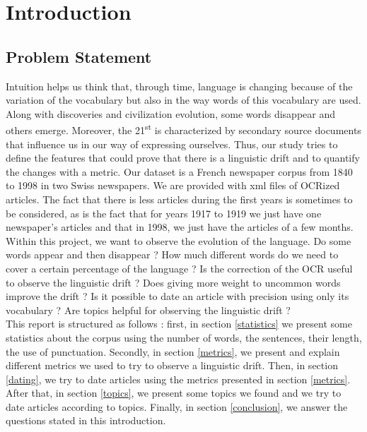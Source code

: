\section{Introduction}

\subsection{Problem Statement}
Intuition helps us think that, through time, language is changing because of the variation of the vocabulary but also in the way words of this vocabulary are used.
Along with discoveries and civilization evolution, some words disappear and others emerge. Moreover, the 21\textsuperscript{st} is characterized by secondary source documents that influence us in our way of expressing ourselves. Thus, our study tries to define the features that could prove that there is a linguistic drift and to quantify the changes with a metric.
Our dataset is a French newspaper corpus from 1840 to 1998 in two Swiss newspapers. We are provided with xml files of OCRized articles. The fact that there is less articles during the first years is sometimes to be considered, as is the fact that for years 1917 to 1919 we just have one newspaper's articles and that in 1998, we just have the articles of a few months.\\

Within this project, we want to observe the evolution of the language. Do some words appear and then disappear ? How much different words do we need to cover a certain percentage of the language ? Is the correction of the OCR useful to observe the linguistic drift ? Does giving more weight to uncommon words improve the drift ? Is it possible to date an article with precision using only its vocabulary ? Are topics helpful for observing the linguistic drift ?\\

This report is structured as follows : first, in section \ref{statistics} we present some statistics about the corpus using the number of words, the sentences, their length, the use of punctuation. Secondly, in section \ref{metrics}, we present and explain different metrics we used to try to observe a linguistic drift. Then, in section \ref{dating}, we try to date articles using the metrics presented in section \ref{metrics}. After that, in section \ref{topics}, we present some topics we found and we try to date articles according to topics. Finally, in section \ref{conclusion}, we answer the questions stated in this introduction.
